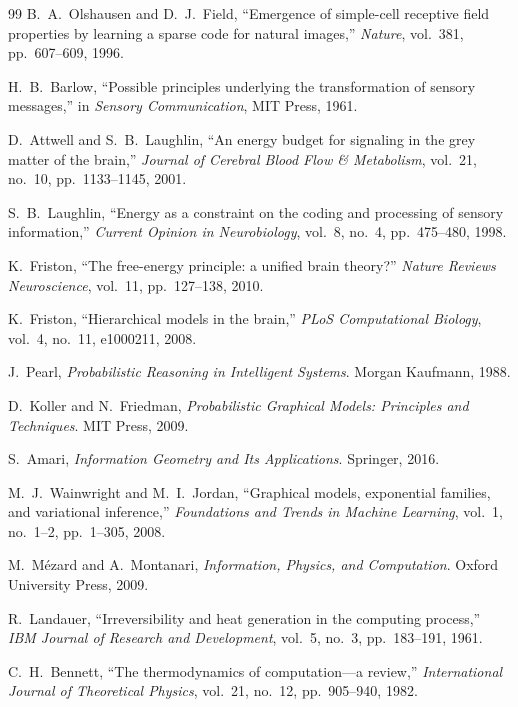 \documentclass[12pt]{article}
\theoremstyle{plain}
\theoremstyle{definition}
\theoremstyle{remark}
\begin{document}
\begin{thebibliography}{99}
B.~A.~Olshausen and D.~J.~Field,
``Emergence of simple-cell receptive field properties by learning a sparse code for natural images,''
\textit{Nature}, vol.~381, pp.~607--609, 1996.

H.~B.~Barlow,
``Possible principles underlying the transformation of sensory messages,''
in \textit{Sensory Communication}, MIT Press, 1961.

D.~Attwell and S.~B.~Laughlin,
``An energy budget for signaling in the grey matter of the brain,''
\textit{Journal of Cerebral Blood Flow \& Metabolism}, vol.~21, no.~10, pp.~1133--1145, 2001.

S.~B.~Laughlin,
``Energy as a constraint on the coding and processing of sensory information,''
\textit{Current Opinion in Neurobiology}, vol.~8, no.~4, pp.~475--480, 1998.

K.~Friston,
``The free-energy principle: a unified brain theory?''
\textit{Nature Reviews Neuroscience}, vol.~11, pp.~127--138, 2010.

K.~Friston,
``Hierarchical models in the brain,''
\textit{PLoS Computational Biology}, vol.~4, no.~11, e1000211, 2008.

J.~Pearl,
\textit{Probabilistic Reasoning in Intelligent Systems}.
Morgan Kaufmann, 1988.

D.~Koller and N.~Friedman,
\textit{Probabilistic Graphical Models: Principles and Techniques}.
MIT Press, 2009.

S.~Amari,
\textit{Information Geometry and Its Applications}.
Springer, 2016.

M.~J.~Wainwright and M.~I.~Jordan,
``Graphical models, exponential families, and variational inference,''
\textit{Foundations and Trends in Machine Learning}, vol.~1, no.~1--2, pp.~1--305, 2008.

M.~Mézard and A.~Montanari,
\textit{Information, Physics, and Computation}.
Oxford University Press, 2009.

R.~Landauer,
``Irreversibility and heat generation in the computing process,''
\textit{IBM Journal of Research and Development}, vol.~5, no.~3, pp.~183--191, 1961.

C.~H.~Bennett,
``The thermodynamics of computation---a review,''
\textit{International Journal of Theoretical Physics}, vol.~21, no.~12, pp.~905--940, 1982.


\end{thebibliography}
\end{document}
